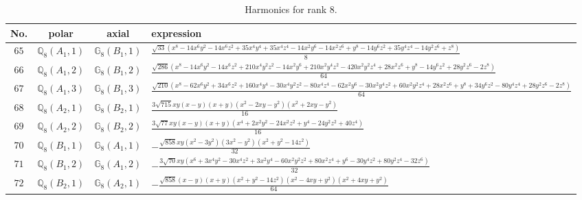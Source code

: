 \documentclass[fleqn,8pt,landscape]{jsarticle}
\begin{document}
\begin{table}[ht!]
\begin{center}
\caption{Harmonics for rank 8.}
\renewcommand{\arraystretch}{1.3}
\begin{tabular}{cccl} \hline \hline
No. & polar & axial & expression \\ \hline
$ 65 $ & $ \mathbb{Q}_{8}(A_{1},1) $ & $ \mathbb{G}_{8}(B_{1},1) $ & $ \frac{\sqrt{33} \left(x^{8} - 14 x^{6} y^{2} - 14 x^{6} z^{2} + 35 x^{4} y^{4} + 35 x^{4} z^{4} - 14 x^{2} y^{6} - 14 x^{2} z^{6} + y^{8} - 14 y^{6} z^{2} + 35 y^{4} z^{4} - 14 y^{2} z^{6} + z^{8}\right)}{8} $ \\
$ 66 $ & $ \mathbb{Q}_{8}(A_{1},2) $ & $ \mathbb{G}_{8}(B_{1},2) $ & $ \frac{\sqrt{286} \left(x^{8} - 14 x^{6} y^{2} - 14 x^{6} z^{2} + 210 x^{4} y^{2} z^{2} - 14 x^{2} y^{6} + 210 x^{2} y^{4} z^{2} - 420 x^{2} y^{2} z^{4} + 28 x^{2} z^{6} + y^{8} - 14 y^{6} z^{2} + 28 y^{2} z^{6} - 2 z^{8}\right)}{64} $ \\
$ 67 $ & $ \mathbb{Q}_{8}(A_{1},3) $ & $ \mathbb{G}_{8}(B_{1},3) $ & $ \frac{\sqrt{210} \left(x^{8} - 62 x^{6} y^{2} + 34 x^{6} z^{2} + 160 x^{4} y^{4} - 30 x^{4} y^{2} z^{2} - 80 x^{4} z^{4} - 62 x^{2} y^{6} - 30 x^{2} y^{4} z^{2} + 60 x^{2} y^{2} z^{4} + 28 x^{2} z^{6} + y^{8} + 34 y^{6} z^{2} - 80 y^{4} z^{4} + 28 y^{2} z^{6} - 2 z^{8}\right)}{64} $ \\
$ 68 $ & $ \mathbb{Q}_{8}(A_{2},1) $ & $ \mathbb{G}_{8}(B_{2},1) $ & $ \frac{3 \sqrt{715} x y \left(x - y\right) \left(x + y\right) \left(x^{2} - 2 x y - y^{2}\right) \left(x^{2} + 2 x y - y^{2}\right)}{16} $ \\
$ 69 $ & $ \mathbb{Q}_{8}(A_{2},2) $ & $ \mathbb{G}_{8}(B_{2},2) $ & $ \frac{3 \sqrt{77} x y \left(x - y\right) \left(x + y\right) \left(x^{4} + 2 x^{2} y^{2} - 24 x^{2} z^{2} + y^{4} - 24 y^{2} z^{2} + 40 z^{4}\right)}{16} $ \\
$ 70 $ & $ \mathbb{Q}_{8}(B_{1},1) $ & $ \mathbb{G}_{8}(A_{1},1) $ & $ - \frac{\sqrt{858} x y \left(x^{2} - 3 y^{2}\right) \left(3 x^{2} - y^{2}\right) \left(x^{2} + y^{2} - 14 z^{2}\right)}{32} $ \\
$ 71 $ & $ \mathbb{Q}_{8}(B_{1},2) $ & $ \mathbb{G}_{8}(A_{1},2) $ & $ - \frac{3 \sqrt{70} x y \left(x^{6} + 3 x^{4} y^{2} - 30 x^{4} z^{2} + 3 x^{2} y^{4} - 60 x^{2} y^{2} z^{2} + 80 x^{2} z^{4} + y^{6} - 30 y^{4} z^{2} + 80 y^{2} z^{4} - 32 z^{6}\right)}{32} $ \\
$ 72 $ & $ \mathbb{Q}_{8}(B_{2},1) $ & $ \mathbb{G}_{8}(A_{2},1) $ & $ - \frac{\sqrt{858} \left(x - y\right) \left(x + y\right) \left(x^{2} + y^{2} - 14 z^{2}\right) \left(x^{2} - 4 x y + y^{2}\right) \left(x^{2} + 4 x y + y^{2}\right)}{64} $ \\

\end{tabular}
\end{center}
\end{table}
\end{document}
